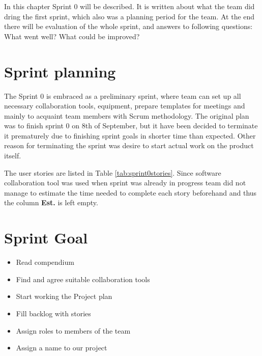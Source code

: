 In this chapter Sprint 0 will be described. It is written about what the team did dring the first sprint, which also was a planning period for the team. At the end there will be evaluation of the  whole sprint, and answers to following questions: What went well? What could be improved? 

\section{Sprint planning}
The Sprint 0 is embraced as a preliminary sprint, where team can set up all necessary collaboration tools, equipment, prepare templates for meetings and mainly to acquaint team members with Scrum methodology. The original plan was to finish sprint 0 on 8th of September, but it have been decided to terminate it prematurely due to finishing sprint goals in shorter time than expected. Other reason for terminating the sprint was desire to start actual work on the product itself.

The user stories are listed in Table \ref{tab:sprint0stories}. Since software collaboration tool was used when sprint was already in progress team did not manage to estimate the time needed to complete each story beforehand and thus the column \textbf{Est.} is left empty.




\section{Sprint Goal}
\begin{itemize}
    \item Read compendium
    \item Find and agree suitable collaboration tools
    \item Start working the Project plan
    \item Fill backlog with stories
    \item Assign roles to members of the team
    \item Assign a name to our project
\end{itemize}

